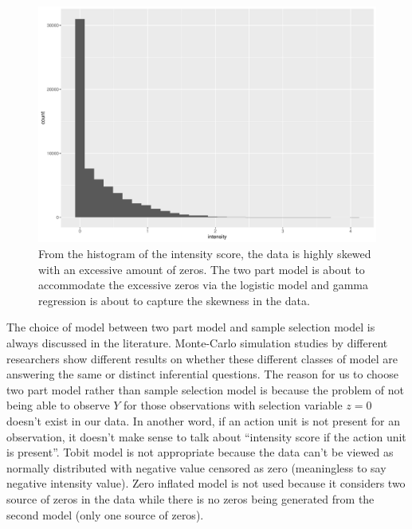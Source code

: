 \documentclass{monashthesis}
\begin{document}
\begin{figure}

{\centering \includegraphics[width=1\linewidth]{figures/intensity-1} 

}

\caption{From the histogram of the intensity score, the data is highly skewed with an excessive amount of zeros. The two part model is about to accommodate the excessive zeros via the logistic model and gamma regression is about to capture the skewness in the data.}\label{fig:intensity}
\end{figure}

The choice of model between two part model and sample selection model is always discussed in the literature. Monte-Carlo simulation studies by different researchers \autocites{leung1996choice}{duan1984choosing}{manning1987monte} show different results on whether these different classes of model are answering the same or distinct inferential questions. The reason for us to choose two part model rather than sample selection model is because the problem of not being able to observe \(Y\) for those observations with selection variable \(z = 0\) doesn't exist in our data. In another word, if an action unit is not present for an observation, it doesn't make sense to talk about ``intensity score if the action unit is present''. Tobit model is not appropriate because the data can't be viewed as normally distributed with negative value censored as zero (meaningless to say negative intensity value). Zero inflated model is not used because it considers two source of zeros in the data while there is no zeros being generated from the second model (only one source of zeros).
\end{document}
